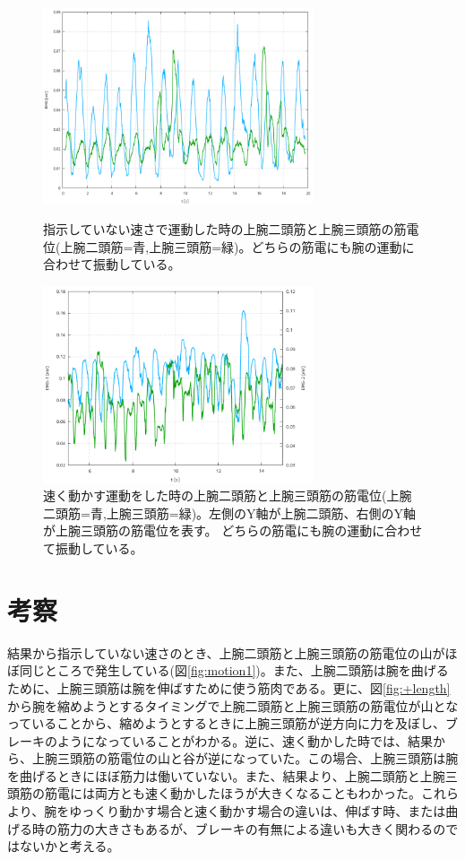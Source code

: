 \documentclass{jsarticle}
\begin{document}
\begin{figure}[htbp]
  \begin{minipage}{0.5\hsize}
    \begin{center}
      \includegraphics[clip,width=80mm]{Graph_4.png}
      \caption{指示していない速さで運動した時の上腕二頭筋と上腕三頭筋の筋電位(上腕二頭筋=青,上腕三頭筋=緑)。どちらの筋電にも腕の運動に合わせて振動している。 \label{fig:EMG1}}
    \end{center}
  \end{minipage}
  \begin{minipage}{0.5\hsize}
    \begin{center}
      \includegraphics[clip,width=80mm]{Graph_5.png}
      \caption{速く動かす運動をした時の上腕二頭筋と上腕三頭筋の筋電位(上腕二頭筋=青,上腕三頭筋=緑)。左側のY軸が上腕二頭筋、右側のY軸が上腕三頭筋の筋電位を表す。 どちらの筋電にも腕の運動に合わせて振動している。\label{fig:EMG2}}
    \end{center}
  \end{minipage}
\end{figure}
  
\section{考察}
結果から指示していない速さのとき、上腕二頭筋と上腕三頭筋の筋電位の山がほぼ同じところで発生している(図\ref{fig:motion1})。また、上腕二頭筋は腕を曲げるために、上腕三頭筋は腕を伸ばすために使う筋肉である。更に、図\ref{fig:+length}から腕を縮めようとするタイミングで上腕二頭筋と上腕三頭筋の筋電位が山となっていることから、縮めようとするときに上腕三頭筋が逆方向に力を及ぼし、ブレーキのようになっていることがわかる。逆に、速く動かした時では、結果から、上腕三頭筋の筋電位の山と谷が逆になっていた。この場合、上腕三頭筋は腕を曲げるときにほぼ筋力は働いていない。また、結果より、上腕二頭筋と上腕三頭筋の筋電には両方とも速く動かしたほうが大きくなることもわかった。これらより、腕をゆっくり動かす場合と速く動かす場合の違いは、伸ばす時、または曲げる時の筋力の大きさもあるが、ブレーキの有無による違いも大きく関わるのではないかと考える。
\end{document}
